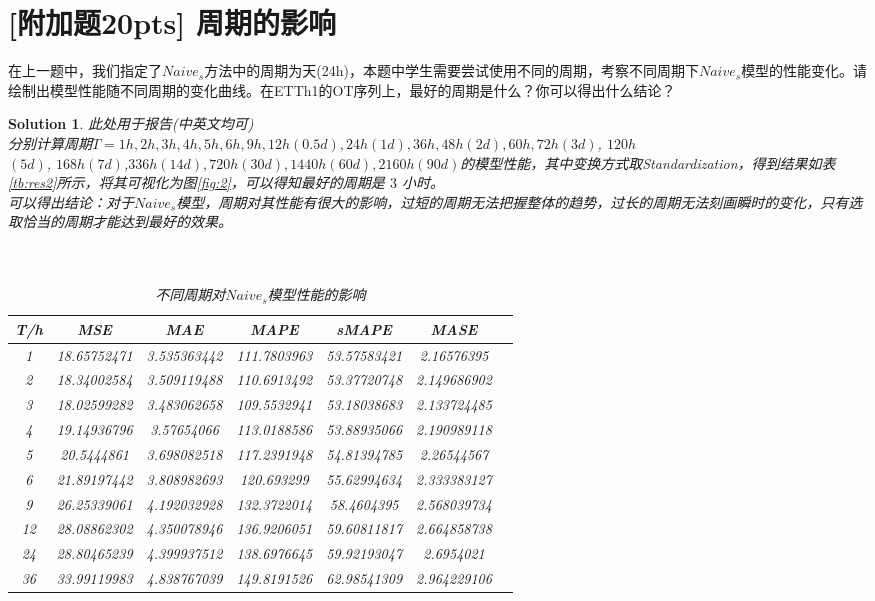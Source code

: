 \documentclass[a4paper,UTF8]{article}
\numberwithin{equation}{section}
\newtheorem*{mySol}{Solution}
\begin{document}
	\section{[附加题20pts] 周期的影响}
	在上一题中，我们指定了$Naive_s$方法中的周期为天(24h)，本题中学生需要尝试使用不同的周期，考察不同周期下$Naive_s$模型的性能变化。请绘制出模型性能随不同周期的变化曲线。在ETTh1的OT序列上，最好的周期是什么？你可以得出什么结论？
	\begin{mySol}
		此处用于报告(中英文均可)
		~\\分别计算周期$T = 1h, 2h, 3h, 4h , 5h, 6h, 9h, 12h(0.5d), 24h(1d), 36h, 48h(2d), 60h, 72h(3d)$, $120h$\\$(5d)$, $168h(7d)$,$336h(14d), 720h(30d), 1440h(60d), 2160h(90d)$的模型性能，其中变换方式取Standardization，得到结果如表\ref{tb:res2}所示，将其可视化为图\ref{fig:2}，可以得知最好的周期是 $3$ 小时。
		~\\可以得出结论：对于$Naive_s$模型，周期对其性能有很大的影响，过短的周期无法把握整体的趋势，过长的周期无法刻画瞬时的变化，只有选取恰当的周期才能达到最好的效果。
		~\\
		\\\\
				\begin{table}[]
			\centering
			\caption{不同周期对$Naive_s$模型性能的影响}
			\begin{tabular}{ccccccc}
				\toprule
				T/h & MSE & MAE & MAPE & sMAPE & MASE \\
				\midrule
				1	& 18.65752471	& 3.535363442	& 111.7803963	& 53.57583421	& 2.16576395 \\
				2	& 18.34002584	& 3.509119488	& 110.6913492	& 53.37720748	& 2.149686902 \\
				3	& 18.02599282	& 3.483062658	& 109.5532941	& 53.18038683	& 2.133724485 \\
				4	& 19.14936796	& 3.57654066	& 113.0188586	& 53.88935066	& 2.190989118 \\
			    5	& 20.5444861	& 3.698082518	& 117.2391948	& 54.81394785	& 2.26544567 \\
				6	& 21.89197442	& 3.808982693	& 120.693299	& 55.62994634	& 2.333383127 \\
				9	& 26.25339061	& 4.192032928	& 132.3722014	& 58.4604395	& 2.568039734 \\
				12	& 28.08862302	& 4.350078946	& 136.9206051	& 59.60811817	& 2.664858738 \\
				24	& 28.80465239	& 4.399937512	& 138.6976645	& 59.92193047	& 2.6954021 \\
				36	& 33.99119983	& 4.838767039	& 149.8191526	& 62.98541309	& 2.964229106 \\

\end{tabular}
\end{table}
\end{mySol}
\end{document}
